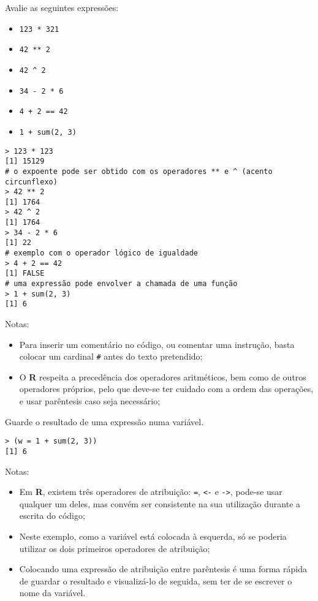 \documentclass{exam}
\begin{document}
\begin{questions}
\question  Avalie as seguintes expressões: \
\begin{itemize}
\item \texttt{123 * 321}
\item \texttt{42 ** 2}
\item \texttt{42 ^ 2}
\item \texttt{34 - 2 * 6}
\item \texttt{4 + 2 == 42}
\item \texttt{1 + sum(2, 3)}
\end{itemize}

\begin{solution}
\begin{verbatim}
> 123 * 123
[1] 15129
# o expoente pode ser obtido com os operadores ** e ^ (acento circunflexo)
> 42 ** 2
[1] 1764
> 42 ^ 2
[1] 1764
> 34 - 2 * 6
[1] 22
# exemplo com o operador lógico de igualdade
> 4 + 2 == 42
[1] FALSE
# uma expressão pode envolver a chamada de uma função
> 1 + sum(2, 3)
[1] 6
\end{verbatim}
Notas:
\begin{itemize}
\item Para inserir um comentário no código, ou comentar uma instrução, basta colocar um cardinal \texttt{\#} antes do texto pretendido;
\item O \textbf{R} respeita a precedência dos operadores aritméticos, bem como de outros operadores próprios, pelo que deve-se ter cuidado com a ordem das operações, e usar parêntesis caso seja necessário;
\end{itemize}
\end{solution}

\question Guarde o resultado de uma expressão numa variável.
\begin{solution}
\begin{verbatim}
> (w = 1 + sum(2, 3))
[1] 6
\end{verbatim}
Notas:
\begin{itemize}
\item Em \textbf{R}, existem três operadores de atribuição: \texttt{=}, \texttt{<-} e \texttt{->}, pode-se usar qualquer um deles, mas convém ser consistente na sua utilização durante a escrita do código;
\item Neste exemplo, como a variável está colocada à esquerda, só se poderia utilizar os dois primeiros operadores de atribuição;
\item Colocando uma expressão de atribuição entre parêntesis é uma forma rápida de guardar o resultado e visualizá-lo de seguida, sem ter de se escrever o nome da variável.
\end{itemize}
\end{solution}


\end{questions}
\end{document}
